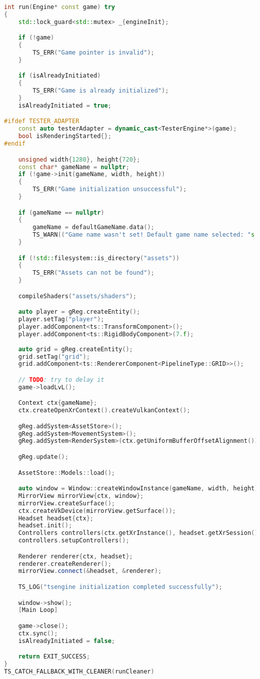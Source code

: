 \begin{lstlisting}[language=c++, caption=Engine's run function (./engine/src/core/core.cpp)]
int run(Engine* const game) try
{
    std::lock_guard<std::mutex> _{engineInit};

    if (!game)
    {
        TS_ERR("Game pointer is invalid");
    }

    if (isAlreadyInitiated)
    {
        TS_ERR("Game is already initialized");
    }
    isAlreadyInitiated = true;

#ifdef TESTER_ADAPTER
    const auto testerAdapter = dynamic_cast<TesterEngine*>(game);
    bool isRenderingStarted{};
#endif

    unsigned width{1280}, height{720};
    const char* gameName = nullptr;
    if (!game->init(gameName, width, height))
    {
        TS_ERR("Game initialization unsuccessful");
    }

    if (gameName == nullptr)
    {
        gameName = defaultGameName.data();
        TS_WARN(("Game name wasn't set! Default game name selected: "s + gameName).c_str());
    }

    if (!std::filesystem::is_directory("assets"))
    {
        TS_ERR("Assets can not be found");
    }

    compileShaders("assets/shaders");

    auto player = gReg.createEntity();
    player.setTag("player");
    player.addComponent<ts::TransformComponent>();
    player.addComponent<ts::RigidBodyComponent>(7.f);
    
    auto grid = gReg.createEntity();
    grid.setTag("grid");
    grid.addComponent<ts::RendererComponent<PipelineType::GRID>>();

    // TODO: try to delay it
    game->loadLvL();

    Context ctx{gameName};
    ctx.createOpenXrContext().createVulkanContext();

    gReg.addSystem<AssetStore>();
    gReg.addSystem<MovementSystem>();
    gReg.addSystem<RenderSystem>(ctx.getUniformBufferOffsetAlignment());

    gReg.update();

    AssetStore::Models::load();

    auto window = Window::createWindowInstance(gameName, width, height);
    MirrorView mirrorView{ctx, window};
    mirrorView.createSurface();
    ctx.createVkDevice(mirrorView.getSurface());
    Headset headset{ctx};
    headset.init();
    Controllers controllers(ctx.getXrInstance(), headset.getXrSession());
    controllers.setupControllers();

    Renderer renderer{ctx, headset};
    renderer.createRenderer();
    mirrorView.connect(&headset, &renderer);

    TS_LOG("tsengine initialization completed successfully");

    window->show();
    [Main Loop]

    game->close();
    ctx.sync();
    isAlreadyInitiated = false;

    return EXIT_SUCCESS;
}
TS_CATCH_FALLBACK_WITH_CLEANER(runCleaner)
\end{lstlisting}

